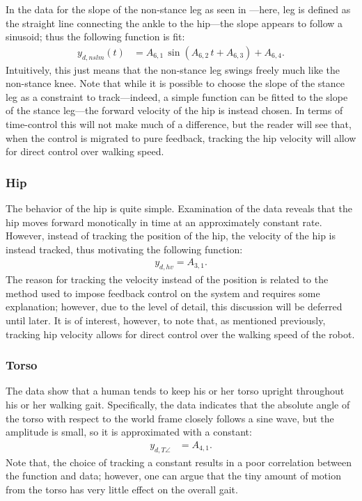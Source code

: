 In the data for the slope of the non-stance leg as seen in
---here, leg is defined as the straight line
connecting the ankle to the hip---the slope appears to follow a sinusoid; thus
the following function is fit:
%
\begin{align*}
  y_{d,nslm}(t) &= A_{6,1} \, \sin(A_{6,2} \, t + A_{6,3}) + A_{6,4}.
\end{align*}
%
Intuitively, this just means that the non-stance leg swings freely much like the
non-stance knee.
%
Note that while it is possible to choose the slope of the stance leg as a
constraint to track---indeed, a simple function can be fitted to the slope of
the stance leg---the forward velocity of the hip is instead chosen.
%
In terms of time-control this will not make much of a difference, but the reader
will see that, when the control is migrated to pure feedback, tracking the hip
velocity will allow for direct control over walking speed.


\subsubsection{Hip}

The behavior of the hip is quite simple.
%
Examination of the data reveals that the hip moves forward monotically in time
at an approximately constant rate.
%
However, instead of tracking the position of the hip, the velocity of the hip is
instead tracked, thus motivating the following function:
%
\begin{align*}
  y_{d,hv} = A_{3,1}.
\end{align*}
%
The reason for tracking the velocity instead of the position is related to the
method used to impose feedback control on the system and requires some
explanation; however, due to the level of detail, this discussion will be
deferred until later.
%
It is of interest, however, to note that, as mentioned previously, tracking hip
velocity allows for direct control over the walking speed of the robot.


\subsubsection{Torso}

The data show that a human tends to keep his or her torso upright throughout his
or her walking gait.
%
Specifically, the data indicates that the absolute angle of the torso with
respect to the world frame closely follows a sine wave, but the amplitude is
small, so it is approximated with a constant:
%
\begin{align*}
  y_{d,T\angle} &= A_{4,1}.
\end{align*}
%
Note that, the choice of tracking a constant results in a poor correlation
between the function and data; however, one can argue that the tiny amount of
motion from the torso has very little effect on the overall gait.


